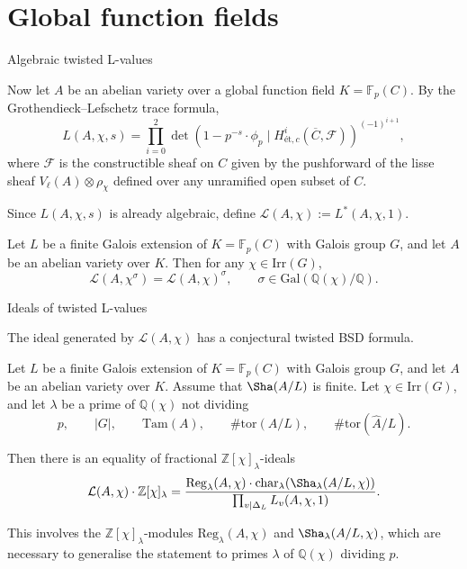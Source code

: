 \documentclass[10pt]{beamer}
\begin{document}
\section{Global function fields}

\begin{frame}[t]{Algebraic twisted L-values}

Now let $ A $ be an abelian variety over a global function field $ K = \mathbb{F}_p(C) $. \pause By the Grothendieck--Lefschetz trace formula,
$$ L(A, \chi, s) = \prod_{i = 0}^2 \det(1 - p^{-s} \cdot \phi_p \mid H_{\text{\'et}, c}^i(\overline{C}, \mathcal{F}))^{(-1)^{i + 1}}, $$
where $ \mathcal{F} $ is the constructible sheaf on $ C $ given by the pushforward of the lisse sheaf $ V_\ell(A) \otimes \rho_\chi $ defined over any unramified open subset of $ C $.

\pause

\vspace{0.5cm} Since $ L(A, \chi, s) $ is already algebraic, define $ \mathcal{L}(A, \chi) := L^*(A, \chi, 1) $.

\pause

\begin{theorem}[A. 2024]
Let $ L $ be a finite Galois extension of $ K = \mathbb{F}_p(C) $ with Galois group $ G $, and let $ A $ be an abelian variety over $ K $. Then for any $ \chi \in \mathrm{Irr}(G) $,
$$ \mathcal{L}(A, \chi^\sigma) = \mathcal{L}(A, \chi)^\sigma, \qquad \sigma \in \mathrm{Gal}(\mathbb{Q}(\chi) / \mathbb{Q}). $$
\end{theorem}

\end{frame}

\begin{frame}[t]{Ideals of twisted L-values}

The ideal generated by $ \mathcal{L}(A, \chi) $ has a conjectural twisted BSD formula.

\pause

\begin{theorem}
Let $ L $ be a finite Galois extension of $ K = \mathbb{F}_p(C) $ with Galois group $ G $, and let $ A $ be an abelian variety over $ K $. Assume that $ \Sha(A / L) $ is finite. Let $ \chi \in \mathrm{Irr}(G) $, and let $ \lambda $ be a prime of $ \mathbb{Q}(\chi) $ not dividing
$$ p, \qquad |G|, \qquad \mathrm{Tam}(A), \qquad \#\mathrm{tor}(A / L), \qquad \#\mathrm{tor}(\widehat{A} / L). $$

\pause

Then there is an equality of fractional $ \mathbb{Z}[\chi]_\lambda $-ideals
$$ \mathcal{L}(A, \chi) \cdot \mathbb{Z}[\chi]_\lambda = \dfrac{\mathrm{Reg}_\lambda(A, \chi) \cdot \mathrm{char}_\lambda(\Sha_\lambda(A / L, \chi))}{\prod_{v \mid \Delta_L} L_v(A, \chi, 1)}. $$
\end{theorem}

This involves the $ \mathbb{Z}[\chi]_\lambda $-modules $ \mathrm{Reg}_\lambda(A, \chi) $ and $ \Sha_\lambda(A / L, \chi) $, which are necessary to generalise the statement to primes $ \lambda $ of $ \mathbb{Q}(\chi) $ dividing $ p $.

\end{frame}
\end{document}
